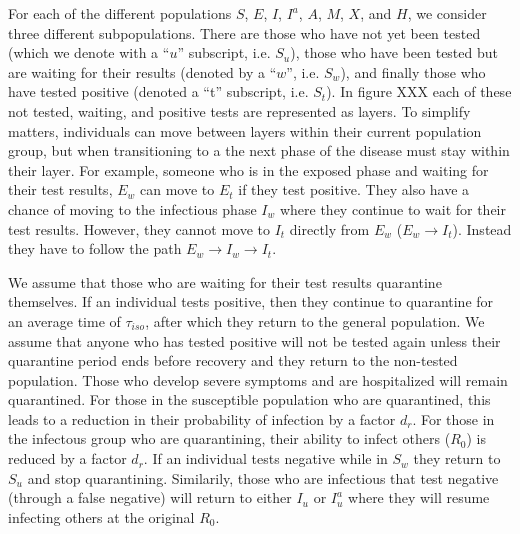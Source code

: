 \documentclass[notitlepage, superscriptaddress]{revtex4-2}
\begin{document}
For each of the different populations $S$, $E$, $I$, $I^{a}$, $A$, $M$, $X$, and $H$, we consider three different subpopulations. There are those who have not yet been tested (which we denote with a ``$u$'' subscript, i.e. $S_{u}$), those who have been tested but are waiting for their results (denoted by a ``$w$'', i.e. $S_{w}$), and finally those who have tested positive (denoted a ``t'' subscript, i.e. $S_{t}$). In figure XXX each of these not tested, waiting, and positive tests are represented as layers. To simplify matters, individuals can move between layers within their current population group, but when transitioning to a the next phase of the disease must stay within their layer. For example, someone who is in the exposed phase and waiting for their test results, $E_{w}$ can move to $E_{t}$ if they test positive. They also have a chance of moving to the infectious phase $I_{w}$ where they continue to wait for their test results. However, they cannot move to $I_{t}$ directly from $E_{w}$ ($E_{w} \rightarrow I_{t}$). Instead they have to follow the path $E_{w} \rightarrow I_{w} \rightarrow I_{t}$. 

We assume that those who are waiting for their test results quarantine themselves. If an individual tests positive, then they continue to quarantine for an average time of $\tau_{iso}$, after which they return to the general population. We assume that anyone who has tested positive will not be tested again unless their quarantine period ends before recovery and they return to the non-tested population. Those who develop severe symptoms and are hospitalized will remain quarantined. For those in the susceptible population who are quarantined, this leads to a reduction in their probability of infection by a factor $d_{r}$. For those in the infectous group who are quarantining, their ability to infect others ($R_{0}$) is reduced by a factor $d_{r}$. If an individual tests negative while in $S_{w}$ they return to $S_{u}$ and stop quarantining. Similarily, those who are infectious that test negative (through a false negative) will return to either $I_{u}$ or $I^{a}_{u}$ where they will resume infecting others at the original $R_{0}$. 
\end{document}
